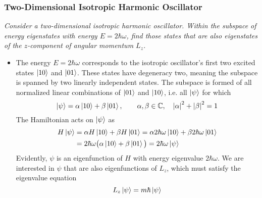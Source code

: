 \documentclass[11pt, a4paper]{article}
\begin{document}
\subsubsection{Two-Dimensional Isotropic Harmonic Oscillator} \label{qmv:sss:2dqho}
\textit{Consider a two-dimensional isotropic harmonic oscillator. Within the subspace of energy eigenstates with energy $ E = 2\hbar \omega $, find those states that are also eigenstates of the $ z $-component of angular momentum $ L_{z} $.}
\begin{itemize}
	\item The energy $ E = 2\hbar \omega $ corresponds to the isotropic oscillator's first two excited states $ \ket{10} $ and $ \ket{01} $. These states have degeneracy two, meaning the subspace is spanned by two linearly independent states. The subspace is formed of all normalized linear combinations of $ \ket{01} $ and $ \ket{10} $, i.e. all $ \ket{\psi} $ for which
	\begin{equation*}
		\ket{\psi} = \alpha \ket{10} + \beta \ket{01}, \qquad \alpha, \beta \in \mathbb{C}, \quad \abs{\alpha}^{2} + \abs{\beta}^{2} = 1
	\end{equation*}
	The Hamiltonian acts on $ \ket{\psi} $ as
	\begin{align*}
		H \ket{\psi} &= \alpha H \ket{10} + \beta H \ket{01} = \alpha 2\hbar \omega \ket{10} + \beta 2\hbar \omega \ket{01}\\
		&=2\hbar \omega \big(\alpha \ket{10} + \beta \ket{01}\big) = 2\hbar \omega \ket{\psi}
	\end{align*}
	Evidently, $ \psi $ is an eigenfunction of $ H $ with energy eigenvalue $ 2\hbar \omega $.	We are interested in $ \psi $ that are also eigenfunctions of $ L_{z} $, which must satisfy the eigenvalue equation
	\begin{equation*}
		L_{z}\ket{\psi} = m \hbar \ket{\psi}
	\end{equation*}
	

\end{itemize}
\end{document}
